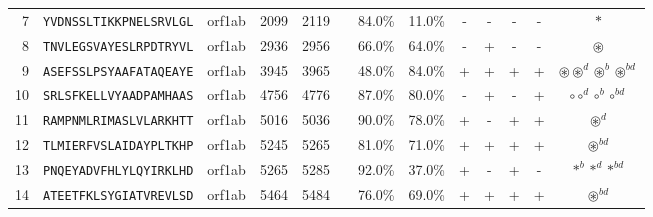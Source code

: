 \begin{tabular}{rcccccccccccc}
7  &  \texttt{YVDNSSLTIKKPNELSRVLGL} &  orf1ab &   2099 &  2119 &                &                          84.0\% &                           11.0\% &          - &           - &          - &           - &                                                                                                         $ \ast $ \\
8  &  \texttt{TNVLEGSVAYESLRPDTRYVL} &  orf1ab &   2936 &  2956 &                &                          66.0\% &                           64.0\% &          - &           + &          - &           - &                                                                                                  $ \circledast $ \\
9  &  \texttt{ASEFSSLPSYAAFATAQEAYE} &  orf1ab &   3945 &  3965 &                &                          48.0\% &                           84.0\% &          + &           + &          + &           + &                                                     $ \circledast \circledast^d \circledast^b \circledast^{bd} $ \\
10 &  \texttt{SRLSFKELLVYAADPAMHAAS} &  orf1ab &   4756 &  4776 &                &                          87.0\% &                           80.0\% &          - &           + &          - &           + &                                                                             $ \circ \circ^d \circ^b \circ^{bd} $ \\
11 &  \texttt{RAMPNMLRIMASLVLARKHTT} &  orf1ab &   5016 &  5036 &                &                          90.0\% &                           78.0\% &          + &           - &          + &           + &                                                                                                $ \circledast^d $ \\
12 &  \texttt{TLMIERFVSLAIDAYPLTKHP} &  orf1ab &   5245 &  5265 &                &                          81.0\% &                           71.0\% &          + &           + &          + &           + &                                                                                             $ \circledast^{bd} $ \\
13 &  \texttt{PNQEYADVFHLYLQYIRKLHD} &  orf1ab &   5265 &  5285 &                &                          92.0\% &                           37.0\% &          + &           - &          + &           - &                                                                                      $ \ast^b \ast^d \ast^{bd} $ \\
14 &  \texttt{ATEETFKLSYGIATVREVLSD} &  orf1ab &   5464 &  5484 &                &                          76.0\% &                           69.0\% &          + &           + &          + &           + &                                                                                             $ \circledast^{bd} $ \\

\end{tabular}
